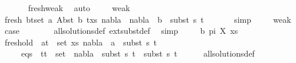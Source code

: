 \begin{isabellebody}
\ \ \ \ \ \isamarkupfalse%
\ fresh{\isacharunderscore}{\kern0pt}weak\ \isamarkupfalse%
\ auto\isanewline
\ \ \ \isamarkupfalse%
\ weak{}\isanewline
\ \ \ \isamarkupfalse%
\ fresh{\isacharcolon}{\kern0pt}\ {\isachardoublequoteopen}{\isasymforall}{\isacharparenleft}{\kern0pt}b{\isacharcomma}{\kern0pt}t{\isacharparenright}{\kern0pt}{\isasymin}set\ {\isacharparenleft}{\kern0pt}{\isacharparenleft}{\kern0pt}a{\isacharcomma}{\kern0pt}\ Abst\ b\ t{\isacharprime}{\kern0pt}{\isacharparenright}{\kern0pt}{\isacharhash}{\kern0pt}xs{\isacharparenright}{\kern0pt}{\isachardot}{\kern0pt}\ {\isacharparenleft}{\kern0pt}nabla{}\ {\isasymunion}\ nabla{}{\isacharparenright}{\kern0pt}\ {\isasymturnstile}\ b\ {\isasymsharp}\ subst\ s{}\ t{\isachardoublequoteclose}\isanewline
\ \ \ \ \ \isamarkupfalse%
\ simp\isanewline
\ \ \ \isamarkupfalse%
\ weak{}{\isacharparenleft}{\kern0pt}{}{\isacharparenright}{\kern0pt}\ \isamarkupfalse%
\ {\isacharquery}{\kern0pt}case\ \isanewline
\ \ \ \ \ \isamarkupfalse%
\ all{\isacharunderscore}{\kern0pt}solutions{\isacharunderscore}{\kern0pt}def\ ext{\isacharunderscore}{\kern0pt}subst{\isacharunderscore}{\kern0pt}def\ \isamarkupfalse%
\ simp\isanewline
{}\isamarkupfalse%
\isanewline
\ \ \isamarkupfalse%
\ {\isacharparenleft}{\kern0pt}{}\ b\ pi\ X\ xs{\isacharparenright}{\kern0pt}\isanewline
\ \ \isamarkupfalse%
\ fresh{\isacharunderscore}{\kern0pt}old{\isacharcolon}{\kern0pt}\ {\isachardoublequoteopen}{\isasymforall}\ {\isacharparenleft}{\kern0pt}a{\isacharcomma}{\kern0pt}t{\isacharparenright}{\kern0pt}\ {\isasymin}\ set\ xs{\isachardot}{\kern0pt}\ nabla{}\ {\isasymturnstile}\ a\ {\isasymsharp}\ subst\ s{}\ t{\isachardoublequoteclose}\isanewline
\ \ \ \ \ eqs{\isacharcolon}{\kern0pt}\ {\isachardoublequoteopen}{\isasymforall}\ {\isacharparenleft}{\kern0pt}t{}{\isacharcomma}{\kern0pt}t{}{\isacharparenright}{\kern0pt}\ {\isasymin}\ set\ {\isacharbrackleft}{\kern0pt}{\isacharbrackright}{\kern0pt}{\isachardot}{\kern0pt}\ nabla{}\ {\isasymturnstile}\ subst\ s{}\ t{}\ {\isasymapprox}\ subst\ s{}\ t{}{\isachardoublequoteclose}\isanewline
\ \ \ \ \isamarkupfalse%
\ all{\isacharunderscore}{\kern0pt}solutions{\isacharunderscore}{\kern0pt}def\ \isamarkupfalse%

\end{isabellebody}
